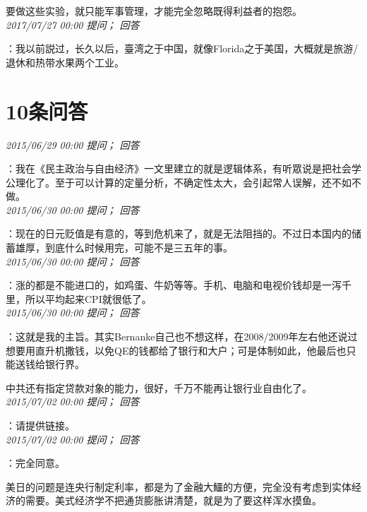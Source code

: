 \documentclass[twocolumn]{ctexart}
\begin{document}
要做这些实验，就只能军事管理，才能完全忽略既得利益者的抱怨。\\

\textit{\hfill\noindent\small 2017/07/27 00:00 提问； 回答}

：我以前説过，长久以后，臺湾之于中国，就像Florida之于美国，大概就是旅游/退休和热带水果两个工业。\\

\section{10条问答}

\textit{\hfill\noindent\small 2015/06/29 00:00 提问； 回答}

：我在《民主政治与自由经济》一文里建立的就是逻辑体系，有听眾说是把社会学公理化了。至于可以计算的定量分析，不确定性太大，会引起常人误解，还不如不做。\\

\textit{\hfill\noindent\small 2015/06/30 00:00 提问； 回答}

：现在的日元贬值是有意的，等到危机来了，就是无法阻挡的。不过日本国内的储蓄雄厚，到底什么时候用完，可能不是三五年的事。\\

\textit{\hfill\noindent\small 2015/06/30 00:00 提问； 回答}

：涨的都是不能进口的，如鸡蛋、牛奶等等。手机、电脑和电视价钱却是一泻千里，所以平均起来CPI就很低了。\\

\textit{\hfill\noindent\small 2015/06/30 00:00 提问； 回答}

：这就是我的主旨。其实Bernanke自己也不想这样，在2008/2009年左右他还说过想要用直升机撒钱，以免QE的钱都给了银行和大户；可是体制如此，他最后也只能送钱给银行界。

中共还有指定贷款对象的能力，很好，千万不能再让银行业自由化了。\\

\textit{\hfill\noindent\small 2015/07/02 00:00 提问； 回答}

：请提供链接。\\

\textit{\hfill\noindent\small 2015/07/02 00:00 提问； 回答}

：完全同意。

美日的问题是连央行制定利率，都是为了金融大鱷的方便，完全没有考虑到实体经济的需要。美式经济学不把通货膨胀讲清楚，就是为了要这样浑水摸鱼。\\
\end{document}
